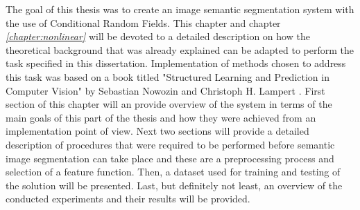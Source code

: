 The goal of this thesis was to create an image semantic segmentation system with the use of Conditional Random Fields. This chapter and chapter \textit{\ref{chapter:nonlinear} } will be devoted to a detailed description on how the theoretical background that was already explained can be adapted to perform the task specified in this dissertation. Implementation of methods chosen to address this task was based on a book titled "Structured Learning and Prediction in Computer Vision" by Sebastian Nowozin and Christoph H. Lampert \cite{Nowozin}. First section of this chapter will an provide overview of the system in terms of the main goals of this part of the thesis and how they were achieved from an implementation point of view. Next two sections will provide a detailed description of procedures that were required to be performed before semantic image segmentation can take place and these are a preprocessing process and selection of a feature function. Then, a dataset used for training and testing of the solution will be presented. Last, but definitely not least, an overview of the conducted experiments and their results will be provided.